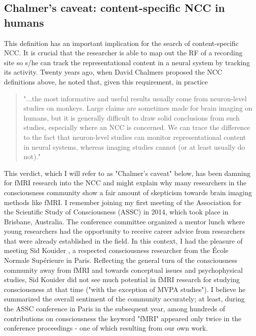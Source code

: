 \subsection{Chalmer's caveat: content-specific NCC in humans}
This definition has an important implication for the search of content-specific NCC. It is crucial that the researcher is able to map out the RF of a recording site so s/he can track the representational content in a neural system by tracking its activity. Twenty years ago, when David Chalmers proposed the NCC definitions above, he noted that, given this requirement, in practice

\begin{quotation}
"...the most informative and useful results usually come from neuron-level studies on monkeys. Large claims are sometimes made for brain imaging on humans, but it is generally difficult to draw solid conclusions from such studies, especially where an NCC is concerned. We can trace the difference to the fact that neuron-level studies can monitor representational content in neural systems, whereas imaging studies cannot (or at least usually do not)."
\parencite[p. 25]{Chalmers2000}
\end{quotation}

This verdict, which I will refer to as "Chalmer's caveat" below, has been damning for fMRI research into the NCC and might explain why many researchers in the consciousness community show a fair amount of skepticism towards brain imaging methods like fMRI. I remember joining my first meeting of the Association for the Scientific Study of Consciousness (ASSC) in 2014, which took place in Brisbane, Australia. The conference committee organized a mentor lunch where young researchers had the opportunity to receive career advice from researchers that were already established in the field. In this context, I had the pleasure of meeting Sid Kouider \parencite{Kouider2010}, a respected consciousness researcher from the École Normale Supérieure in Paris. Reflecting the general turn of the consciousness community away from fMRI and towards conceptual issues and psychophysical studies, Sid Kouider did not see much potential in fMRI research for studying consciousness at that time ("with the exception of MVPA studies"). I believe he summarized the overall sentiment of the community accurately; at least, during the ASSC conference in Paris in the subsequent year, among hundreds of contributions on consciousness the keyword "fMRI" appeared only twice in the conference proceedings - one of which resulting from our own work.

